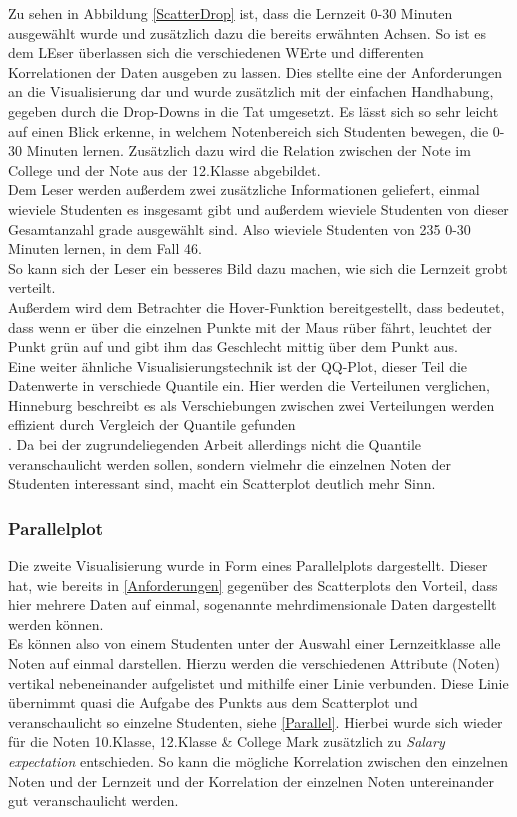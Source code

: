 \documentclass[usegeometry=true]{scrartcl}
\begin{document}
Zu sehen in Abbildung \ref{ScatterDrop} ist, dass die Lernzeit 0-30 Minuten ausgewählt wurde und zusätzlich dazu die bereits erwähnten Achsen. So ist es dem LEser überlassen sich die verschiedenen WErte und differenten Korrelationen der Daten ausgeben zu lassen. Dies stellte eine der Anforderungen an die Visualisierung dar und wurde zusätzlich mit der einfachen Handhabung, gegeben durch die Drop-Downs in die Tat umgesetzt. Es lässt sich so sehr leicht auf einen Blick erkenne, in welchem Notenbereich sich Studenten bewegen, die 0-30 Minuten lernen. Zusätzlich dazu wird die Relation zwischen der Note im College und der Note aus der 12.Klasse abgebildet. \\
Dem Leser werden außerdem zwei zusätzliche Informationen geliefert, einmal wieviele Studenten es insgesamt gibt und außerdem wieviele Studenten von dieser Gesamtanzahl grade ausgewählt sind. Also wieviele Studenten von 235 0-30 Minuten lernen, in dem Fall 46. \\
So kann sich der Leser ein besseres Bild dazu machen, wie sich die Lernzeit grobt verteilt.\\
Außerdem wird dem Betrachter die Hover-Funktion bereitgestellt, dass bedeutet, dass wenn er über die einzelnen Punkte mit der Maus rüber fährt, leuchtet der Punkt grün auf und gibt ihm das Geschlecht mittig über dem Punkt aus.\\

\noindent Eine weiter ähnliche Visualisierungstechnik ist der QQ-Plot, dieser Teil die Datenwerte in verschiede Quantile ein. Hier werden die Verteilunen verglichen, Hinneburg beschreibt es als \glqq Verschiebungen zwischen zwei Verteilungen werden effizient durch Vergleich der Quantile gefunden\grqq \\
\cite{Hinneburg2022}. Da bei der zugrundeliegenden Arbeit allerdings nicht die Quantile veranschaulicht werden sollen, sondern vielmehr die einzelnen Noten der Studenten interessant sind, macht ein Scatterplot deutlich mehr Sinn.

\subsubsection{Parallelplot}
\label{VisZwei}
Die zweite Visualisierung wurde in Form eines Parallelplots dargestellt. Dieser hat, wie bereits in \ref{Anforderungen} gegenüber des Scatterplots den Vorteil, dass hier mehrere Daten auf einmal, sogenannte mehrdimensionale Daten dargestellt werden können.\\ Es können also von einem Studenten unter der Auswahl einer Lernzeitklasse alle Noten auf einmal darstellen. Hierzu werden die verschiedenen Attribute (Noten) vertikal nebeneinander aufgelistet und mithilfe einer Linie verbunden. Diese Linie übernimmt quasi die Aufgabe des Punkts aus dem Scatterplot und veranschaulicht so einzelne Studenten, siehe \ref{Parallel}. Hierbei wurde sich wieder für die Noten 10.Klasse, 12.Klasse \& College Mark zusätzlich zu \textit{Salary expectation} entschieden. So kann die mögliche Korrelation zwischen den einzelnen Noten und der Lernzeit und der Korrelation der einzelnen Noten untereinander gut veranschaulicht werden.\\
\end{document}
